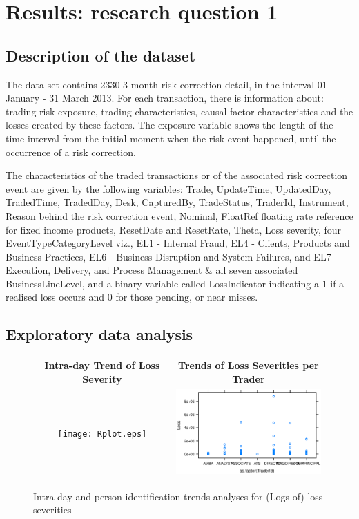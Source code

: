 \documentclass[a4paper]{article}
\begin{document}
\section{Results: research question 1}

\subsection{Description of the dataset}

The data set contains 2330 3-month risk correction detail, in the interval 01 January - 31 March 2013. For each transaction, there is information about: trading risk exposure, trading characteristics, causal factor characteristics and the losses created by these factors. The exposure variable shows the length of the time interval from the initial moment when the risk event happened, until the occurrence of a risk correction.\medskip

The characteristics of the traded transactions or of the associated risk correction event are given by the following variables: Trade, UpdateTime, UpdatedDay, TradedTime, TradedDay, Desk, CapturedBy, TradeStatus, TraderId, Instrument, Reason behind the risk correction event, Nominal, FloatRef floating rate reference for fixed income products, ResetDate and ResetRate, Theta, Loss severity, four EventTypeCategoryLevel viz., EL1 - Internal Fraud, EL4 - Clients, Products and Business Practices, EL6 - Business Disruption and System Failures, and EL7 - Execution, Delivery, and Process Management  \& all seven associated  BusinessLineLevel, and a binary variable called LossIndicator indicating a $1$ if a realised loss occurs and $0$ for those pending, or near misses.

\subsection{Exploratory data analysis}

\begin{figure}
\begin{frame}
      \centering
       \begin{tabular}{cc}
        \textbf{Intra-day Trend of Loss Severity} & \textbf{Trends of Loss Severities per Trader} \\
        \texttt{[image: Rplot.eps]}
         &
         \includegraphics[width=7cm]{Rplot01.eps}
         \end{tabular}
    \end{frame}
    \caption{Intra-day and person identification trends analyses for (Logs of) loss severities}
    \label{Fig1}
\end{figure}
\end{document}
